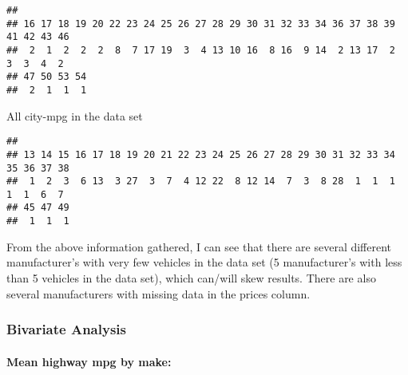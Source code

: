 \documentclass[
]{article}
\newenvironment{Shaded}{\begin{snugshade}}{\end{snugshade}}
\newcommand{\AttributeTok}[1]{\textcolor[rgb]{0.77,0.63,0.00}{#1}}
\newcommand{\FunctionTok}[1]{\textcolor[rgb]{0.00,0.00,0.00}{#1}}
\newcommand{\NormalTok}[1]{#1}
\newcommand{\SpecialCharTok}[1]{\textcolor[rgb]{0.00,0.00,0.00}{#1}}
\newcommand{\StringTok}[1]{\textcolor[rgb]{0.31,0.60,0.02}{#1}}
\begin{document}
\begin{verbatim}
## 
## 16 17 18 19 20 22 23 24 25 26 27 28 29 30 31 32 33 34 36 37 38 39 41 42 43 46 
##  2  1  2  2  2  8  7 17 19  3  4 13 10 16  8 16  9 14  2 13 17  2  3  3  4  2 
## 47 50 53 54 
##  2  1  1  1
\end{verbatim}

All city-mpg in the data set

\begin{Shaded}
\end{Shaded}

\begin{verbatim}
## 
## 13 14 15 16 17 18 19 20 21 22 23 24 25 26 27 28 29 30 31 32 33 34 35 36 37 38 
##  1  2  3  6 13  3 27  3  7  4 12 22  8 12 14  7  3  8 28  1  1  1  1  1  6  7 
## 45 47 49 
##  1  1  1
\end{verbatim}

From the above information gathered, I can see that there are several
different manufacturer's with very few vehicles in the data set (5
manufacturer's with less than 5 vehicles in the data set), which
can/will skew results. There are also several manufacturers with missing
data in the prices column.

\hypertarget{bivariate-analysis}{%
\subsubsection{Bivariate Analysis}\label{bivariate-analysis}}

\hypertarget{mean-highway-mpg-by-make}{%
\paragraph{Mean highway mpg by make:}\label{mean-highway-mpg-by-make}}
\end{document}
